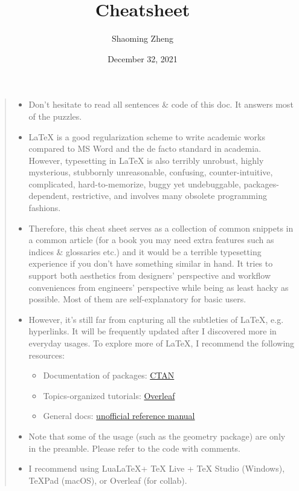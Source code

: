 \documentclass[a4paper]{article}
\title{\LaTeXe{} Cheatsheet}
\author{Shaoming Zheng}
\date{December 32, 2021}
\begin{document}
\maketitle
\thispagestyle{firstpagestyle}

\tableofcontents

\begin{quote}
\begin{itemize}
\item Don't hesitate to read all sentences \& code of this doc. It answers most of the puzzles.
\item \LaTeX{} is a good regularization scheme to write academic works compared to MS Word and the de facto standard in academia. However, typesetting in \LaTeX{} is also terribly unrobust, highly mysterious, stubbornly unreasonable, confusing, counter-intuitive, complicated, hard-to-memorize, buggy yet undebuggable, packages-dependent, restrictive, and involves many obsolete programming fashions.
\item Therefore, this cheat sheet serves as a collection of common snippets in a common article (for a book you may need extra features such as indices \& glossaries etc.) and it would be a terrible typesetting experience if you don't have something similar in hand. It tries to support both aesthetics from designers' perspective and workflow conveniences from engineers' perspective while being as least hacky as possible. Most of them are self-explanatory for basic users.
\item However, it's still far from capturing all the subtleties of \LaTeX{}, e.g. hyperlinks. It will be frequently updated after I discovered more in everyday usages. To explore more of \LaTeX, I recommend the following resources:
\begin{itemize}
\item Documentation of packages: \href{https://ctan.org/}{CTAN}
\item Topics-organized tutorials: \href{https://www.overleaf.com/learn}{Overleaf}
\item General docs: \href{https://latexref.xyz/}{\LaTeXe{} unofficial reference manual}
\end{itemize}
\item Note that some of the usage (such as the geometry package) are only in the preamble. Please refer to the code with comments.
\item I recommend using Lua\LaTeX + \TeX{} Live + \TeX{} Studio (Windows), \TeX Pad (macOS), or Overleaf (for collab). 
\begin{itemize}

\end{itemize}
\end{itemize}
\end{quote}
\end{document}
